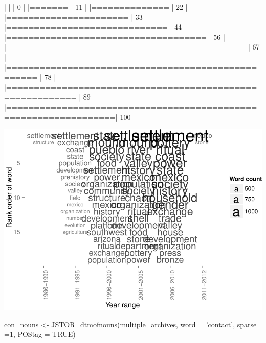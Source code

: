 \documentclass[10pt]{article}
\newenvironment{CodeChunk}{}{}
\begin{document}
\begin{CodeChunk}
\begin{CodeChunk}
\begin{CodeOutput}
  |                                                                       
  |                                                                 |   0%
  |                                                                       
  |=======                                                          |  11%
  |                                                                       
  |==============                                                   |  22%
  |                                                                       
  |======================                                           |  33%
  |                                                                       
  |=============================                                    |  44%
  |                                                                       
  |====================================                             |  56%
  |                                                                       
  |===========================================                      |  67%
  |                                                                       
  |===================================================              |  78%
  |                                                                       
  |==========================================================       |  89%
  |                                                                       
  |=================================================================| 100%
\end{CodeOutput}

\includegraphics{509Assignment_files/figure-latex/onegram4-1} \begin{CodeInput}
con_nouns <- JSTOR_dtmofnouns(multiple_archives, word = 'contact', sparse =1, POStag = TRUE)
\end{CodeInput}
\begin{CodeOutput}


\end{CodeOutput}
\end{CodeChunk}
\end{CodeChunk}
\end{document}
